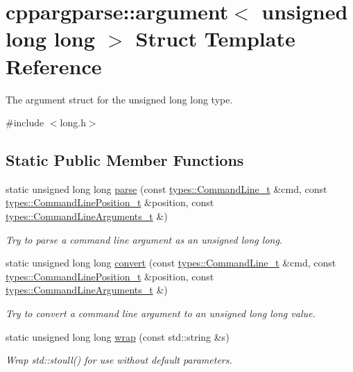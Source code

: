 \hypertarget{structcppargparse_1_1argument_3_01unsigned_01long_01long_01_4}{}\section{cppargparse\+:\+:argument$<$ unsigned long long $>$ Struct Template Reference}
\label{structcppargparse_1_1argument_3_01unsigned_01long_01long_01_4}


The argument struct for the unsigned long long type.  




{\ttfamily \#include $<$long.\+h$>$}

\subsection*{Static Public Member Functions}
\begin{DoxyCompactItemize}
\item 
static unsigned long long \hyperlink{structcppargparse_1_1argument_3_01unsigned_01long_01long_01_4_afd2f459eea01e012b9bc0d5592fa0936}{parse} (const \hyperlink{types_8h_a80adf2418b7ce9fe616698efa7533ecf}{types\+::\+Command\+Line\+\_\+t} \&cmd, const \hyperlink{types_8h_a43b4f43f8940de1bf09ced6f1b668053}{types\+::\+Command\+Line\+Position\+\_\+t} \&position, const \hyperlink{types_8h_a003c660afe2ee9c6cc39aea966e8926d}{types\+::\+Command\+Line\+Arguments\+\_\+t} \&)
\begin{DoxyCompactList}\small\item\em Try to parse a command line argument as an unsigned long long. \end{DoxyCompactList}\item 
static unsigned long long \hyperlink{structcppargparse_1_1argument_3_01unsigned_01long_01long_01_4_ac17e3c6079e302a59b23485ed64b2c37}{convert} (const \hyperlink{types_8h_a80adf2418b7ce9fe616698efa7533ecf}{types\+::\+Command\+Line\+\_\+t} \&cmd, const \hyperlink{types_8h_a43b4f43f8940de1bf09ced6f1b668053}{types\+::\+Command\+Line\+Position\+\_\+t} \&position, const \hyperlink{types_8h_a003c660afe2ee9c6cc39aea966e8926d}{types\+::\+Command\+Line\+Arguments\+\_\+t} \&)
\begin{DoxyCompactList}\small\item\em Try to convert a command line argument to an unsigned long long value. \end{DoxyCompactList}\item 
static unsigned long long \hyperlink{structcppargparse_1_1argument_3_01unsigned_01long_01long_01_4_a90e072df50bf4185486fe9c45d3e3ef0}{wrap} (const std\+::string \&s)
\begin{DoxyCompactList}\small\item\em Wrap std\+::stoull() for use without default parameters. \end{DoxyCompactList}\end{DoxyCompactItemize}


